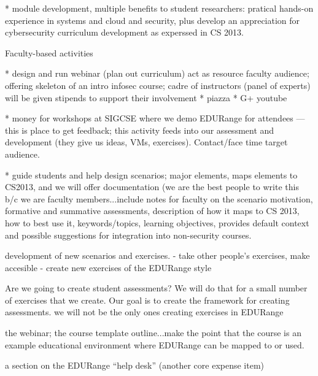  * module development, multiple benefits to student researchers: pratical hands-on experience in systems and cloud and security, plus
   develop an appreciation for cybersecurity curriculum development as experssed in CS 2013.

Faculty-based activities 

 * design and run webinar (plan out curriculum) act as resource faculty
   audience; offering skeleton of an intro infosec course; cadre of instructors (panel of experts) will be given stipends to
   support their involvement
    * piazza
    * G+ youtube

 * money for workshops at SIGCSE where we demo EDURange for attendees --- this is place to get feedback; this activity
   feeds into our assessment and development (they give us ideas, VMs, exercises). Contact/face time target audience.

 * guide students and help design scenarios; major elements, maps
 elements to CS2013, and we will offer documentation (we are the best
 people to write this b/c we are faculty members...include notes for
 faculty on the scenario motivation, formative and summative
 assessments, description of how it maps to CS 2013, how to best use
 it, keywords/topics, learning objectives, provides default context
 and possible suggestions for integration into non-security courses.

development of new scenarios and exercises.
 - take other people's exercises, make accesible
 - create new exercises of the EDURange style

{Are we going to create student assessments?  We will do that for a small number
of exercises that we create.  Our goal is to create the framework for creating assessments.
 we will not be the only ones creating exercises in EDURange }



the webinar; the course template outline...make the point that
   the course is an example educational environment where EDURange can
   be mapped to or used.

a section on the EDURange ``help desk'' (another core expense item)



